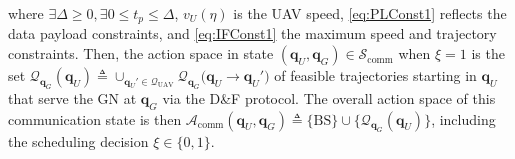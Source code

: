 \documentclass[10pt, twocolumn]{IEEEtran}
\theoremstyle{plain}
\theoremstyle{definition}
\theoremstyle{remark}
\begin{document}
 where $\exists \Delta{\geq}0, \exists 0{\leq}t_p{\leq}\Delta$, $v_U(\eta)$ is the UAV speed, \ref{eq:PLConst1} reflects the data payload constraints, and \ref{eq:IFConst1} the maximum speed and trajectory constraints. Then, the action space in state $(\mathbf{q}_{U},\mathbf{q}_{G}){\in}\mathcal{S}_{\mathrm{comm}}$ when $\xi{=}1$ is the set $\mathcal{Q}_{\mathbf{q}_{G}}(\mathbf{q}_{U}){\triangleq}\cup_{\mathbf{q}_{U}'{\in}\mathcal{Q}_{\mathrm{UAV}}}\mathcal{Q}_{\mathbf{q}_{G}}\big(\mathbf{q}_{U}{\rightarrow}\mathbf{q}_{U}'\big)$ of feasible trajectories starting in $\mathbf{q}_{U}$ that serve the GN at $\mathbf{q}_{G}$ via the D\&F protocol. The overall action space of this communication state is then $\mathcal{A}_{\mathrm{comm}}(\mathbf{q}_{U},\mathbf{q}_{G}){\triangleq}\{\mathrm{BS}\}{\cup}\{\mathcal{Q}_{\mathbf{q}_{G}}(\mathbf{q}_{U})\}$, including the scheduling decision $\xi\in\{0,1\}$.
\end{document}
